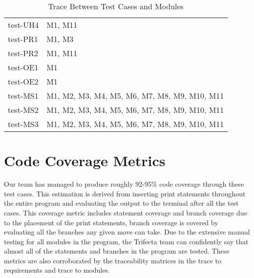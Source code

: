 \documentclass[12pt, titlepage]{article}
\begin{document}
\begin{table}[H]
\begin{tabular}{p{} p{}}
test-UH4 & M1, M11\\
test-PR1 & M1, M3\\
test-PR2 & M1, M11\\
test-OE1 & M1\\
test-OE2 & M1\\
test-MS1 & M1, M2, M3, M4, M5, M6, M7, M8, M9, M10, M11\\
test-MS2 & M1, M2, M3, M4, M5, M6, M7, M8, M9, M10, M11\\
test-MS3 & M1, M2, M3, M4, M5, M6, M7, M8, M9, M10, M11\\
\bottomrule
\end{tabular}
\caption{Trace Between Test Cases and Modules}
\label{TblRT}
\end{table}

\section{Code Coverage Metrics}

Our team has managed to produce roughly 92-95\% code coverage through these test cases. This estimation is derived from inserting print statements throughout the entire program and evaluating the output to the terminal after all the test cases. This coverage metric includes statement coverage and branch coverage due to the placement of the print statements, branch coverage is covered by evaluating all the branches any given move can take. Due to the extensive manual testing for all modules in the program, the Trifecta team can confidently say that almost all of the statements and branches in the program are tested. These metrics are also corroborated by the traceability matrices in the trace to requirements and trace to modules.
\end{document}

